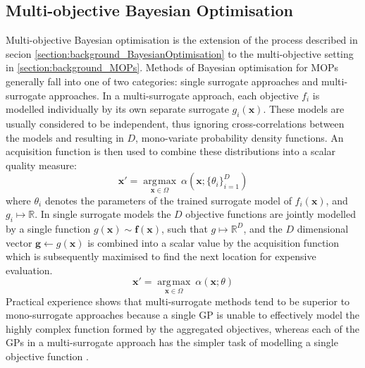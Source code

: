 \documentclass[runningheads]{llncs}
\DeclareMathOperator*{\argmax}{\arg\!\max}
\newcommand{\bx}{\mathbf{x}}
\newcommand{\bff}{\mathbf{f}}
\begin{document}
\subsection{Multi-objective Bayesian Optimisation}
Multi-objective Bayesian optimisation is the extension of the process described in secion \ref{section:background_BayesianOptimisation} to the multi-objective setting in \ref{section:background_MOPs}. Methods of Bayesian optimisation for MOPs generally fall into one of two categories: single surrogate approaches and multi-surrogate approaches. In a multi-surrogate approach, each objective $f_i$ is modelled individually by its own separate surrogate $g_i(\bx)$. These models are usually considered to be independent, thus ignoring
cross-correlations between the models and resulting in $D$, mono-variate probability density functions. An acquisition function is then used to combine these distributions into a scalar quality measure:
\begin{equation}\label{eqn: eqn: max_alpha_mop}
   \bx' = \underset{\mathbf{x}\in \Omega}{\argmax}\:\alpha(\mathbf{x}; \{\theta_i\}_{i=1}^D)
\end{equation}
where $\theta_i$ denotes the parameters of the trained surrogate model of $f_i(\bx)$, and $g_i \mapsto \mathbb{R}$. In single surrogate models the $D$ objective functions are jointly modelled by a single function $g(\bx) \sim \bff(\bx)$, such that $g \mapsto \mathbb{R}^D$, and the $D$ dimensional vector $ \mathbf{g} \gets g(\bx)$ is combined into a scalar value by the acquisition function which is subsequently maximised to find the next location for expensive evaluation.
\begin{equation}\label{eqn: eqn: max_alpha_monosurrogate}
   \bx' = \underset{\mathbf{x}\in \Omega}{\argmax}\:\alpha(\mathbf{x}; \theta)
\end{equation}
Practical experience shows that multi-surrogate methods tend to be superior to mono-surrogate approaches because a single GP is unable to effectively model the highly complex function formed by the aggregated objectives, whereas each of the GPs in a multi-surrogate approach has the simpler task of modelling a single objective function \cite{rahat2017alternative}. 
\end{document}
